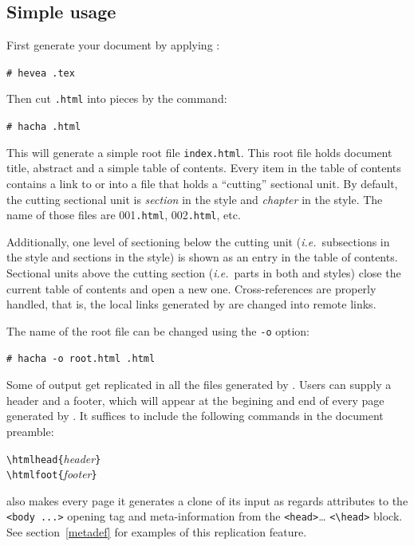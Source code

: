 \subsection{Simple usage}
First generate your {\html} document by applying \hevea{}:
\begin{flushleft}
\texttt{\# hevea }\texttt{.tex}
\end{flushleft}
Then cut \texttt{.html} into pieces by the command:
\begin{flushleft}
\texttt{\# hacha }\texttt{.html}
\end{flushleft}
This will generate a simple root file
\texttt{index.html}.
This root file holds document title, abstract and a simple table of
contents.
Every item in the table of contents contains a link to or into a file
that holds a ``cutting'' sectional unit.
By default, the cutting sectional unit is {\em section} in the
 style and {\em chapter} in the 
style.
The name of those files are 001\texttt{.html},
002\texttt{.html}, etc.

Additionally, one level of sectioning below the cutting unit
(\emph{i.e.}\ subsections in the  style and sections in the
 style) is shown
as an entry in the table of contents.
Sectional units above the cutting section (\emph{i.e.}\ parts in both
 and  styles) close the current table
of contents and open a new one.
Cross-references are properly handled, that is, the local links generated by
\hevea{} are changed into remote links.

The name of the root  file can be changed using the
\verb+-o+ option:
\begin{flushleft}
\texttt{\# hacha -o root.html }\texttt{.html}
\end{flushleft}


Some of \hevea{} output get replicated in all the files generated by
\hacha{}.
\label{html:footer}%
Users can supply a header and a footer, which  will appear at the
begining and end of every page generated by \hacha{}. It suffices to
include the following commands in the document preamble:
\begin{flushleft}
\quad\verb+\htmlhead{+\textit{header}\verb+}+\\
\quad\verb+\htmlfoot{+\textit{footer}\verb+}+
\end{flushleft}

\hacha{} also makes every page it generates a clone of its input as
regards attributes to the \verb+<body ...>+ opening tag and
meta-information from the \verb+<head>+\ldots{} \verb+<\head>+
block. See section~\ref{metadef} for examples of this replication
feature.

